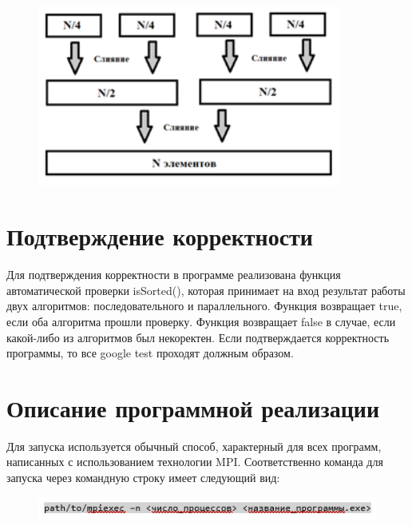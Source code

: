 \documentclass{report}
\begin{document}
\begin{figure}[htp]
    \centering
    \includegraphics[width=10cm]{images/image9.png}
    \label{fig:galaxy}
\end{figure}

\newpage

\section*{Подтверждение корректности}

\par Для подтверждения корректности в программе реализована функция автоматической проверки isSorted(), которая принимает на вход результат работы двух алгоритмов: последовательного и параллельного. Функция возвращает true, если оба алгоритма прошли проверку. Функция возвращает false в случае, если какой-либо из алгоритмов был некоректен. Если подтверждается корректность программы, то все google test проходят должным образом.

\newpage
\section*{Описание программной реализации}

\par Для запуска используется обычный способ, характерный для всех программ, написанных с использованием технологии MPI. Соответственно команда для запуска через командную строку имеет следующий вид:

\begin{figure}[htp]
    \centering
    \includegraphics[width=15cm]{images/put.png}
    \label{fig:galaxy}
\end{figure}
\end{document}
